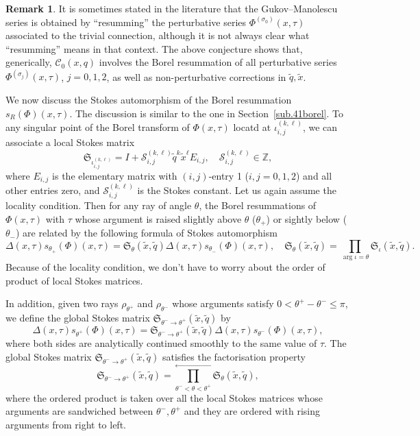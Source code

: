 \documentclass[12pt,reqno]{amsart}
\theoremstyle{definition}
\newtheorem{remark}[theorem]{Remark}
\def\IZ{\mathbb{Z}}
\def\tq{\tilde{q}}
\def\tx{\tilde{x}}
\def\tx{\tilde{x}}
\def\mc{\mathcal}
\def\mf{\mathfrak}
\def\IZ{\mathbb{Z}}
\begin{document}
\begin{remark}
  It is sometimes stated in the literature that the Gukov--Manolescu
  series is obtained by ``resumming'' the perturbative series
  $\Phi^{(\sigma_0)}(x, \tau) $ associated to the trivial connection, although it
  is not always clear what ``resumming'' means in that context. The above conjecture
  shows that, generically, $\mc{C}_0(x,q)$ involves the Borel resummation of all
  perturbative series $\Phi^{(\sigma_j)}(x, \tau)$, $j=0,1,2$, as well as
  non-perturbative corrections in $\tq, \tx$. 
\end{remark}

We now discuss the Stokes automorphism of the Borel resummation
$s_R(\Phi)(x,\tau)$.  The discussion is similar to the one in 
Section~\ref{sub.41borel}.  To any singular point of the Borel
transform of $\Phi(x,\tau)$ locatd at $\iota_{i,j}^{(k,\ell)}$, we can
associate a local Stokes matrix
\begin{equation}
  \mf{S}_{\iota_{i,j}^{(k,\ell)}} = I +
  \mc{S}_{i,j}^{(k,\ell)}\tq^k\tx^\ell E_{i,j}, \quad \mc{S}_{i,j}^{(k,\ell)}\in\IZ,
\end{equation}
where $E_{i,j}$ is the elementary matrix with $(i,j)$-entry 1
($i,j=0,1,2$) and all other entries zero, and
$\mc{S}_{i,j}^{(k,\ell)}$ is the Stokes constant.  Let us again assume
the locality condition.  Then for any ray of angle $\theta$, the Borel
resummations of $\Phi(x,\tau)$ with $\tau$ whose argument is raised
slightly above $\theta$ ($\theta_+$) or sightly below ($\theta_-$) 
are related by the following formula of Stokes automorphism
%
\begin{equation}
  \Delta(x,\tau)s_{\theta_+}(\Phi)(x,\tau) = \mf{S}_{\theta}(\tx,\tq)
  \Delta(x,\tau)s_{\theta_-}(\Phi)(x,\tau),\quad
  \mf{S}_\theta(\tx,\tq) = \prod_{\arg\iota =\theta}\mf{S}_\iota(\tx,\tq).
\end{equation}
%
Because of the locality condition, we don't have to worry about the
order of product of local Stokes matrices.

In addition, given two rays $\rho_{\theta^+}$ and $\rho_{\theta^-}$ whose
arguments satisfy $0<\theta^+-\theta^-\leq \pi$, we define the global
Stokes matrix $\mf{S}_{\theta^-\rightarrow \theta^+}(\tx,\tq)$ by
\begin{equation}
  \Delta(x,\tau)s_{\theta^+}(\Phi)(x,\tau) =
  \mf{S}_{\theta^-\rightarrow \theta^+}(\tx,\tq)
  \Delta(x,\tau)s_{\theta^-}(\Phi)(x,\tau),
\end{equation}
where both sides are analytically continued smoothly to the same value
of $\tau$.  The global Stokes matrix
$\mf{S}_{\theta^-\rightarrow\theta^+}(\tx,\tq)$ satisfies the
factorisation property~\cite{GGM:resurgent,GGM:peacock}
\begin{equation}
  \mf{S}_{\theta^-\rightarrow\theta^+}(\tx,\tq) =
  \prod_{\theta^-<\theta<\theta^+}^{\leftarrow}
  \mf{S}_{\theta}(\tx,\tq),
\end{equation}
where the ordered product is taken over all the local Stokes matrices
whose arguments are sandwiched between $\theta^-,\theta^+$ and they
are ordered with rising arguments from right to left.
\end{document}
